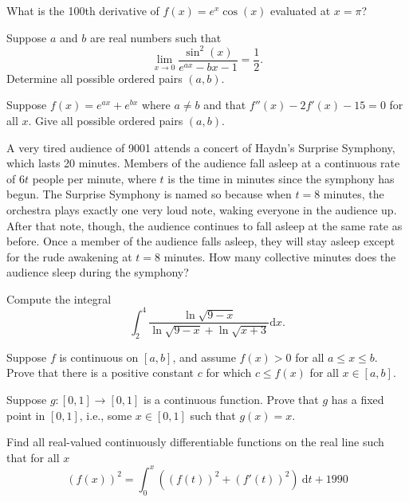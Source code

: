 \documentclass{article}
\begin{document}
\begin{exercise}
What is the 100th derivative of \(f(x)=e^x\cos(x)\) evaluated at \(x=\pi\)?
\end{exercise}

\begin{exercise}
Suppose \(a\) and \(b\) are real numbers such that 
\[\lim_{x\to 0}\frac{\sin^2(x)}{e^{ax}-bx-1} = \frac{1}{2}.\]
Determine all possible ordered pairs \((a,b)\).
\end{exercise}

\begin{exercise}
Suppose \(f(x) = e^{ax} + e^{bx}\) where \(a\neq b\) and that \(f''(x)-2f'(x)-15=0\) for all \(x\).
Give all possible ordered pairs \((a,b)\).
\end{exercise}

\begin{exercise}
A very tired audience of 9001 attends a concert of Haydn's Surprise Symphony, which lasts 20 minutes.
Members of the audience fall asleep at a continuous rate of \(6t\) people per minute, where \(t\) is the time in minutes since the symphony has begun.
The Surprise Symphony is named so because when \(t=8\) minutes, the orchestra plays exactly one very loud note, waking everyone in the audience up.
After that note, though, the audience continues to fall asleep at the same rate as before.
Once a member of the audience falls asleep, they will stay asleep except for the rude awakening at \(t=8\) minutes.
How many collective minutes does the audience sleep during the symphony?
\end{exercise}

\begin{exercise}
Compute the integral
\[\int_2^4\frac{\ln\sqrt{9-x}}{\ln\sqrt{9-x}+\ln\sqrt{x+3}}\mathrm{d}x.\]
\end{exercise}

\begin{exercise}
Suppose $f$ is continuous on $[a,b]$, and assume $f(x)>0$ for all $a\leq x \leq b$. Prove that there is a positive constant $c$ for which $c\leq f(x)$ for all $x\in [a,b]$.
\end{exercise}

\begin{exercise}
Suppose $g:[0,1]\to [0,1]$ is a continuous function. Prove that $g$ has a fixed point in $[0,1]$, i.e., some $x\in [0,1]$ such that $g(x)=x$.
\end{exercise}

\begin{exercise}
Find all real-valued continuously differentiable functions on the real line such that for all $x$
\[(f(x))^2 = \int_0^x \left((f(t))^2 + (f'(t))^2\right)\ \mathrm{d}t + 1990\]
\end{exercise}
\end{document}
